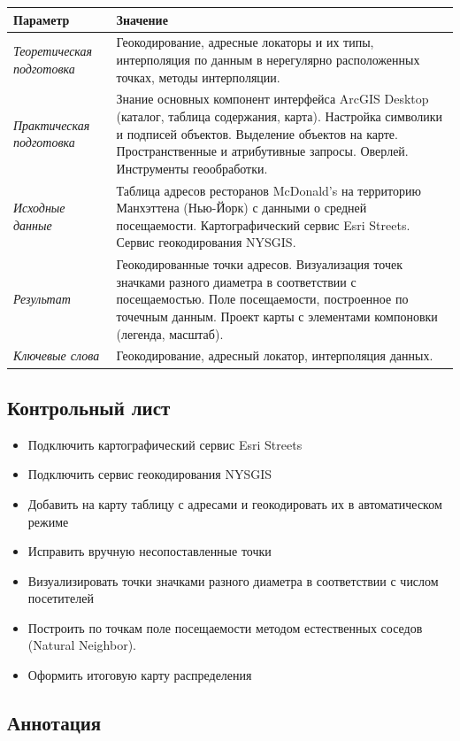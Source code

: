 \documentclass[]{book}
\providecommand{\tightlist}{%
  \setlength{\itemsep}{0pt}\setlength{\parskip}{0pt}}
\theoremstyle{definition}
\theoremstyle{definition}
\theoremstyle{definition}
\theoremstyle{remark}
\begin{document}
\begin{longtable}[]{@{}ll@{}}
\toprule
Параметр & Значение\tabularnewline
\midrule
\endhead
\emph{Теоретическая подготовка} & Геокодирование, адресные локаторы и их
типы, интерполяция по данным в нерегулярно расположенных точках, методы
интерполяции.\tabularnewline
\emph{Практическая подготовка} & Знание основных компонент интерфейса
ArcGIS Desktop (каталог, таблица содержания, карта). Настройка символики
и подписей объектов. Выделение объектов на карте. Пространственные и
атрибутивные запросы. Оверлей. Инструменты геообработки.\tabularnewline
\emph{Исходные данные} & Таблица адресов ресторанов McDonald's на
территорию Манхэттена (Нью-Йорк) с данными о средней посещаемости.
Картографический сервис Esri Streets. Сервис геокодирования
NYSGIS.\tabularnewline
\emph{Результат} & Геокодированные точки адресов. Визуализация точек
значками разного диаметра в соответствии с посещаемостью. Поле
посещаемости, построенное по точечным данным. Проект карты с элементами
компоновки (легенда, масштаб).\tabularnewline
\emph{Ключевые слова} & Геокодирование, адресный локатор, интерполяция
данных.\tabularnewline
\bottomrule
\end{longtable}

\hypertarget{geocoding-control}{%
\subsection{Контрольный лист}\label{geocoding-control}}

\begin{itemize}
\tightlist
\item
  Подключить картографический сервис Esri Streets
\item
  Подключить сервис геокодирования NYSGIS
\item
  Добавить на карту таблицу с адресами и геокодировать их в
  автоматическом режиме
\item
  Исправить вручную несопоставленные точки
\item
  Визуализировать точки значками разного диаметра в соответствии с
  числом посетителей
\item
  Построить по точкам поле посещаемости методом естественных соседов
  (Natural Neighbor).
\item
  Оформить итоговую карту распределения
\end{itemize}

\hypertarget{geocoding-annotation}{%
\subsection{Аннотация}\label{geocoding-annotation}}
\end{document}
